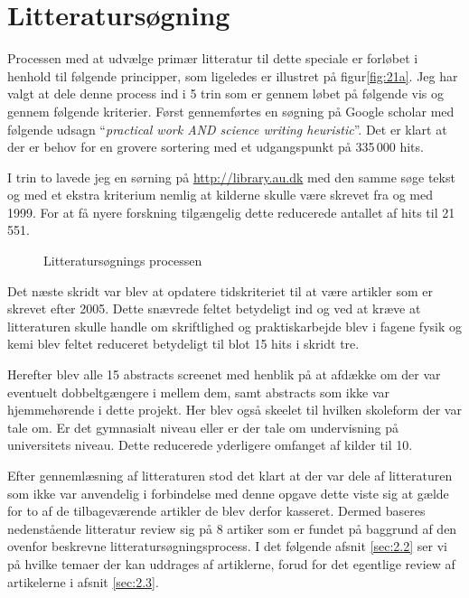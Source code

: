 \section{Litteratursøgning}
\label{sec:2.2}

Processen med at udvælge primær litteratur til dette speciale er forløbet i henhold til følgende principper, som ligeledes er illustret på  figur\vref{fig:21a}. Jeg har valgt at dele denne process ind i 5 trin som er gennem løbet på følgende vis og gennem følgende kriterier. Først gennemførtes en søgning på Google scholar med følgende udsagn ``\emph{practical work AND science writing heuristic}''. Det er klart at der er behov for en grovere sortering med et udgangspunkt på 335\,000 hits. 

I trin to lavede jeg en sørning på \url{http://library.au.dk} med den samme søge tekst og med et ekstra kriterium nemlig at kilderne skulle være skrevet fra og med 1999. For at få nyere forskning tilgængelig dette reducerede antallet af hits til 21\,551. 
\begin{wrapfigure}{o}{0.5\textwidth}
	\centering
	\vspace{-20pt}
	\vspace{0pt}
	\caption{Litteratursøgnings processen}
	\label{fig:21a}
	\vspace{-20pt}
\end{wrapfigure}
Det næste skridt var blev at opdatere tidskriteriet til at være artikler som er skrevet efter 2005. Dette snævrede feltet betydeligt ind og ved at kræve at litteraturen skulle handle om skriftlighed og praktiskarbejde blev i fagene fysik og kemi blev feltet reduceret betydeligt til blot 15 hits i skridt tre.

Herefter blev alle 15 abstracts screenet med henblik på at afdække om der var eventuelt dobbeltgængere i mellem dem, samt abstracts som ikke var hjemmehørende i dette projekt. Her blev også skeelet til hvilken skoleform der var tale om. Er det gymnasialt niveau eller er der tale om undervisning på universitets niveau. Dette reducerede yderligere omfanget af kilder til 10.

Efter gennemlæsning af litteraturen stod det klart at der var dele af litteraturen som ikke var anvendelig i forbindelse med denne opgave dette viste sig at gælde for to af de tilbageværende artikler de blev derfor kasseret. Dermed baseres nedenstående litteratur review sig på 8 artiker som er fundet på baggrund af den ovenfor beskrevne litteratursøgningsprocess. I det følgende afsnit \vref{sec:2.2} ser vi på hvilke temaer der kan uddrages af artiklerne, forud for det egentlige review af artikelerne i afsnit \vref{sec:2.3}. 


